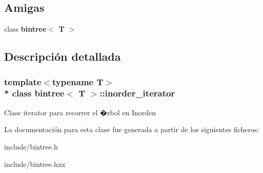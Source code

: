 \subsection*{Amigas}
\begin{DoxyCompactItemize}
\item 
class {\bfseries bintree$<$ T $>$}\hypertarget{classbintree_1_1inorder__iterator_a300e602ae13bd21fa092c5a5899e9eda}{}\label{classbintree_1_1inorder__iterator_a300e602ae13bd21fa092c5a5899e9eda}

\end{DoxyCompactItemize}


\subsection{Descripción detallada}
\subsubsection*{template$<$typename T$>$\\*
class bintree$<$ T $>$\+::inorder\+\_\+iterator}

Clase iterator para recorrer el �rbol en Inorden 

La documentación para esta clase fue generada a partir de los siguientes ficheros\+:\begin{DoxyCompactItemize}
\item 
include/bintree.\+h\item 
include/bintree.\+hxx\end{DoxyCompactItemize}
